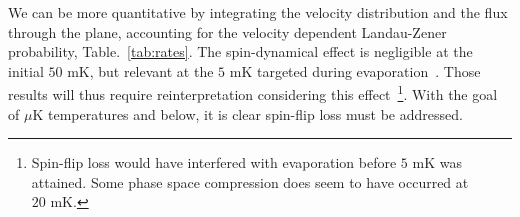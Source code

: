 \documentclass[%
 reprint,
groupedaddress,
 amsmath,amssymb,
 aps,
prl,
]{revtex4-1}
\begin{document}
We can be more quantitative by integrating the velocity distribution and the flux through the plane, accounting for the velocity dependent Landau-Zener probability, Table.~\ref{tab:rates}. The spin-dynamical effect is negligible at the initial $50\text{ mK}$, but relevant at the $5\text{ mK}$ targeted during evaporation~\cite{Stuhl2012evap}. Those results will thus require reinterpretation considering this effect~\footnote{Spin-flip loss would have interfered with evaporation before $5\text{ mK}$ was attained. Some phase space compression does seem to have occurred at $20\text{ mK}$.}. With the goal of $\mu\text{K}$ temperatures and below, it is clear spin-flip loss must be addressed. %



\end{document}
